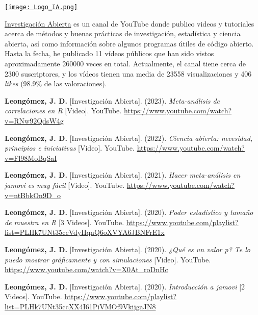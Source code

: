 \documentclass[11pt,a4paper,]{awesome-cv}
\begin{document}
\begin{minipage}[c]{0.10\linewidth}
\href{https://www.youtube.com/@InvestigacionAbierta}{\texttt{[image: Logo\_IA.png]}}
\end{minipage} \begin{minipage}[c]{0.90\linewidth} \begin{footnotesize}
\textcolor{red}{\faYoutube} \href{https://www.youtube.com/@InvestigacionAbierta}{Investigación Abierta} es un canal de YouTube donde publico videos y tutoriales acerca de métodos y buenas prácticas de investigación, estadística y ciencia abierta, así como información sobre algunos programas útiles de código abierto. Hasta la fecha, he publicado 11 vídeos públicos que han sido vistos aproximadamente 260000 veces en total. Actualmente, el canal tiene cerca de 2300 suscriptores, y los vídeos tienen una media de 23558 visualizaciones y 406 \textit{likes} (98.9\% de las valoraciones).

\end{footnotesize}
\end{minipage}

\begingroup
\footnotesize
\setlength{\parindent}{-0.5in}
\setlength{\leftskip}{0.5in}

\textbf{Leongómez, J. D.} {[}Investigación Abierta{]}. (2023).
\emph{Meta-análisis de correlaciones en R} {[}Video{]}. YouTube.
\url{https://www.youtube.com/watch?v=RNw92QdsW4g}

\textbf{Leongómez, J. D.} {[}Investigación Abierta{]}. (2022).
\emph{Ciencia abierta: necesidad, principios e iniciativas} {[}Video{]}.
YouTube. \url{https://www.youtube.com/watch?v=Fl98MoBqSaI}

\textbf{Leongómez, J. D.} {[}Investigación Abierta{]}. (2021).
\emph{Hacer meta-análisis en jamovi es muy fácil} {[}Video{]}. YouTube.
\url{https://www.youtube.com/watch?v=ntBbkOn9D_o}

\textbf{Leongómez, J. D.} {[}Investigación Abierta{]}. (2020).
\emph{Poder estadístico y tamaño de muestra en R} {[}3 Videos{]}.
YouTube.
\url{https://www.youtube.com/playlist?list=PLHk7UNt35ccVdyHqnQ6oXVYA6JBNFrE1x}

\textbf{Leongómez, J. D.} {[}Investigación Abierta{]}. (2020).
\emph{¿Qué es un valor p? Te lo puedo mostrar gráficamente y con
simulaciones} {[}Video{]}. YouTube.
\url{https://www.youtube.com/watch?v=X0At_roDnHc}

\textbf{Leongómez, J. D.} {[}Investigación Abierta{]}. (2020).
\emph{Introducción a jamovi} {[}2 Videos{]}. YouTube.
\url{https://www.youtube.com/playlist?list=PLHk7UNt35ccXX4I61PiVMOf9VkijgaJN8}
\end{document}

